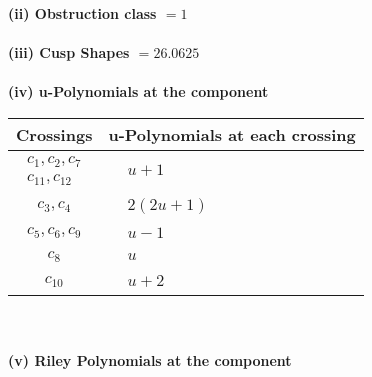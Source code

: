 \documentclass[1p]{elsarticle_modified}
\theoremstyle{definition}
\begin{document}
\flushleft \textbf{(ii) Obstruction class $= 1$}\\~\\
\flushleft \textbf{(iii) Cusp Shapes $= 26.0625$}\\~\\
\newpage\renewcommand{\arraystretch}{1}
\flushleft \textbf{(iv) u-Polynomials at the component}\newline \\
\begin{tabular}{m{50pt}|m{274pt}}
Crossings & \hspace{64pt}u-Polynomials at each crossing \\
\hline $$\begin{aligned}c_{1},c_{2},c_{7}\\c_{11},c_{12}\end{aligned}$$&$\begin{aligned}
&u+1
\end{aligned}$\\
\hline $$\begin{aligned}c_{3},c_{4}\end{aligned}$$&$\begin{aligned}
&2(2 u+1)
\end{aligned}$\\
\hline $$\begin{aligned}c_{5},c_{6},c_{9}\end{aligned}$$&$\begin{aligned}
&u-1
\end{aligned}$\\
\hline $$\begin{aligned}c_{8}\end{aligned}$$&$\begin{aligned}
&u
\end{aligned}$\\
\hline $$\begin{aligned}c_{10}\end{aligned}$$&$\begin{aligned}
&u+2
\end{aligned}$\\
\hline
\end{tabular}\\~\\
\newpage\renewcommand{\arraystretch}{1}
\flushleft \textbf{(v) Riley Polynomials at the component}\newline \\
\end{document}
